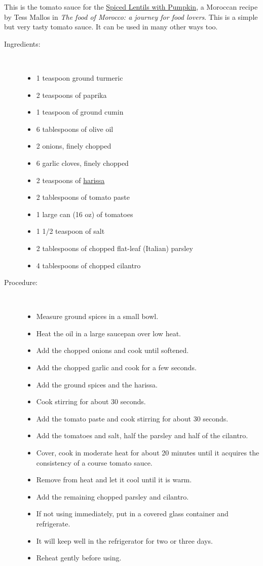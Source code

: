 \documentclass[11pt,letterpaper]{article}
\begin{document}


This is the tomato sauce for the \href{SpicedLentilsWithPumpkin.html}{Spiced Lentils with Pumpkin}, a Moroccan recipe by Tess Mallos in {\it The food of Morocco: a journey for food lovers}. This is a simple but very tasty tomato sauce. It can be used in many other ways too.  

\begin{description}

\item[Ingredients:]\ \\
	\begin{itemize}
	\item 1 teaspoon ground turmeric 
	\item 2 teaspoons of paprika
	\item 1 teaspoon of ground cumin
	\item 6 tablespoons of olive oil
	\item 2 onions, finely chopped
	\item 6 garlic cloves, finely chopped
	\item 2 teaspoons of \href{Harissa.html}{harissa}
	\item 2 tablespoons of tomato paste
	\item 1 large can (16 oz) of tomatoes 
	\item 1 1/2 teaspoon of salt
	\item 2 tablespoons of chopped flat-leaf (Italian) parsley
	\item 4 tablespoons of chopped cilantro
	\end{itemize}

\item[Procedure:]\ \\
	\begin{itemize}
	\item Measure ground spices in a small bowl.
	\item Heat the oil in a large saucepan over low heat.
	\item Add the chopped onions and cook until softened.
	\item Add the chopped garlic and cook for a few seconds.
	\item Add the ground spices and the harissa.
	\item Cook stirring for about 30 seconds.
	\item Add the tomato paste and cook stirring for about 30 seconds.
	\item Add the tomatoes and salt, half the parsley and half of the cilantro.
	\item Cover, cook in moderate heat for about 20 minutes until it acquires the consistency of a course tomato sauce.
	\item Remove from heat and let it cool until it is warm.
	\item	Add the remaining chopped parsley and cilantro.
	\item If not using immediately, put in a covered glass container and refrigerate.
	\item It will keep well in the refrigerator for two or three days.
	\item Reheat gently before using.
	\end{itemize}
\end{description}
\end{document}
